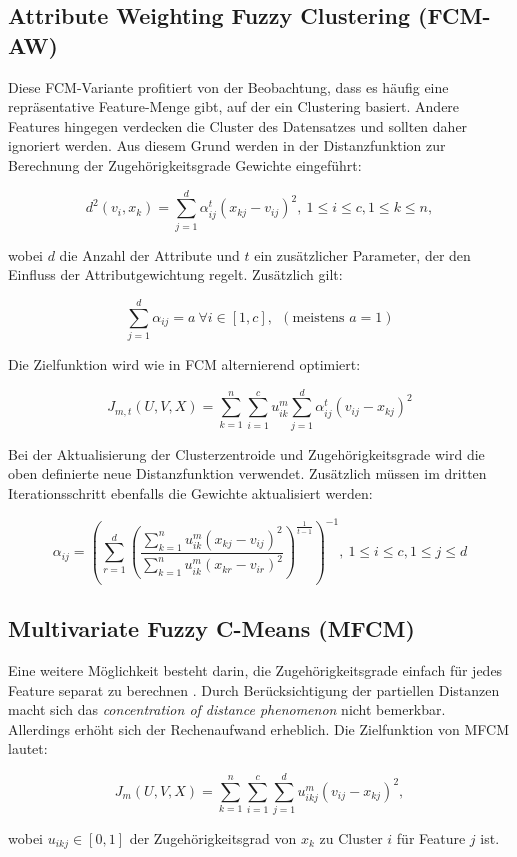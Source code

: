 \documentclass[11pt,ceqn]{book}
\begin{document}
\subsection{Attribute Weighting Fuzzy Clustering (FCM-AW)}
Diese FCM-Variante \cite{fcmaw} profitiert von der Beobachtung, dass es häufig eine repräsentative Feature-Menge gibt, auf der ein Clustering basiert. Andere Features hingegen verdecken die Cluster des Datensatzes und sollten daher ignoriert werden. Aus diesem Grund werden in der Distanzfunktion zur Berechnung der Zugehörigkeitsgrade Gewichte eingeführt:

$$d^2(v_i,x_k) = \sum_{j=1}^d \alpha_{ij}^t(x_{kj}-v_{ij})^2,\ 1\leqslant i \leqslant c, 1\leqslant k \leqslant n,$$

wobei $d$ die Anzahl der Attribute und $t$ ein zusätzlicher Parameter, der den Einfluss der Attributgewichtung regelt.
Zusätzlich gilt:

$$\sum\limits_{j=1}^d \alpha_{ij} = a \ \forall i \in \left[1,c\right], \ \ (\text{meistens } a=1)$$

Die Zielfunktion wird wie in FCM alternierend optimiert:

$$J_{m,t}(U,V,X) = \sum\limits_{k=1}^n \sum\limits_{i=1}^c u_{ik}^m \sum\limits_{j=1}^d \alpha_{ij}^t (v_{ij}-x_{kj})^2$$

Bei der Aktualisierung der Clusterzentroide und Zugehörigkeitsgrade wird die oben definierte neue Distanzfunktion verwendet. Zusätzlich müssen im dritten Iterationsschritt ebenfalls die Gewichte aktualisiert werden:

$$\alpha_{ij} = \left( \sum_{r=1}^d \left(\frac{\sum\limits_{k=1}^n u_{ik}^m (x_{kj}-v_{ij})^2}{\sum\limits_{k=1}^n u_{ik}^m (x_{kr}-v_{ir})^2}\right)^{\frac{1}{t-1}} \right)^{-1}, \ 1\leqslant i\leqslant c, 1\leqslant j \leqslant d$$


\subsection{Multivariate Fuzzy C-Means (MFCM)}
Eine weitere Möglichkeit besteht darin, die Zugehörigkeitsgrade einfach für jedes Feature separat zu berechnen \cite{mfcm}. Durch Berücksichtigung der partiellen Distanzen macht sich das \textit{concentration of distance phenomenon} nicht bemerkbar. Allerdings erhöht sich der Rechenaufwand erheblich. Die Zielfunktion von MFCM lautet:

$$J_{m}(U,V,X) = \sum_{k=1}^n\sum_{i=1}^c\sum_{j=1}^d u_{ikj}^m (v_{ij}-x_{kj})^2,$$

wobei $u_{ikj} \in \left[0,1\right]$ der Zugehörigkeitsgrad von $x_k$ zu Cluster $i$ für Feature $j$ ist.
\end{document}
